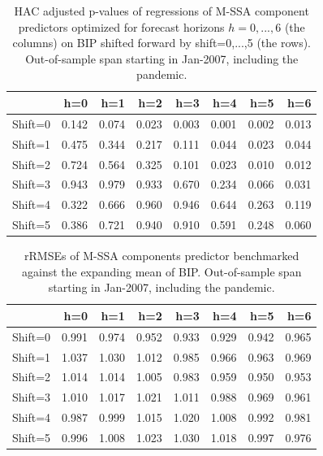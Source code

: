 \documentclass[a4paper]{article}
\begin{document}
\begin{table}[ht]
\centering
\begin{tabular}{rrrrrrrr}
  \hline
 & h=0 & h=1 & h=2 & h=3 & h=4 & h=5 & h=6 \\ 
  \hline
Shift=0 & 0.142 & 0.074 & 0.023 & 0.003 & 0.001 & 0.002 & 0.013 \\ 
  Shift=1 & 0.475 & 0.344 & 0.217 & 0.111 & 0.044 & 0.023 & 0.044 \\ 
  Shift=2 & 0.724 & 0.564 & 0.325 & 0.101 & 0.023 & 0.010 & 0.012 \\ 
  Shift=3 & 0.943 & 0.979 & 0.933 & 0.670 & 0.234 & 0.066 & 0.031 \\ 
  Shift=4 & 0.322 & 0.666 & 0.960 & 0.946 & 0.644 & 0.263 & 0.119 \\ 
  Shift=5 & 0.386 & 0.721 & 0.940 & 0.910 & 0.591 & 0.248 & 0.060 \\ 
   \hline
\end{tabular}
\caption{HAC adjusted p-values of regressions of M-SSA component predictors optimized for forecast horizons $h=0,...,6$  (the columns) on BIP shifted forward by shift=0,...,5 (the rows). Out-of-sample span starting in Jan-2007, including the pandemic.} 
\label{p_val1}
\end{table}%
\begin{table}[ht]
\centering
\begin{tabular}{rrrrrrrr}
  \hline
 & h=0 & h=1 & h=2 & h=3 & h=4 & h=5 & h=6 \\ 
  \hline
Shift=0 & 0.991 & 0.974 & 0.952 & 0.933 & 0.929 & 0.942 & 0.965 \\ 
  Shift=1 & 1.037 & 1.030 & 1.012 & 0.985 & 0.966 & 0.963 & 0.969 \\ 
  Shift=2 & 1.014 & 1.014 & 1.005 & 0.983 & 0.959 & 0.950 & 0.953 \\ 
  Shift=3 & 1.010 & 1.017 & 1.021 & 1.011 & 0.988 & 0.969 & 0.961 \\ 
  Shift=4 & 0.987 & 0.999 & 1.015 & 1.020 & 1.008 & 0.992 & 0.981 \\ 
  Shift=5 & 0.996 & 1.008 & 1.023 & 1.030 & 1.018 & 0.997 & 0.976 \\ 
   \hline
\end{tabular}
\caption{rRMSEs of M-SSA components predictor benchmarked against the expanding mean of BIP. Out-of-sample span starting in Jan-2007, including the pandemic.} 
\label{rRMSE_mSSA_comp_mean2}
\end{table}%
\end{document}
